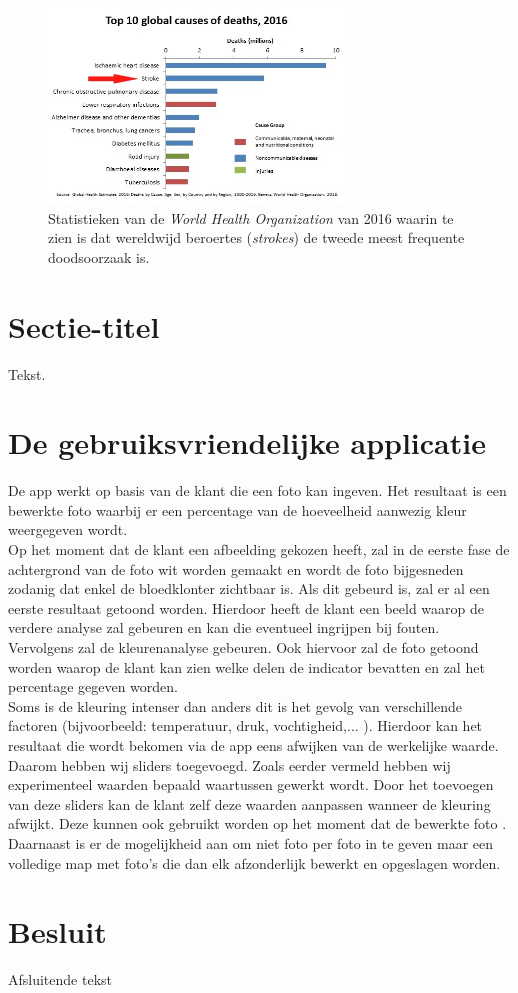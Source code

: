\documentclass[a4paper,kulak]{kulakarticle}
\begin{document}
	\begin{figure}[H]
		\centering
		\includegraphics[width = 0.7\textwidth]{top10doodsoorzaken.png}
	
		\caption{Statistieken van de \textit{World Health Organization} van 2016 waarin te zien is dat wereldwijd beroertes (\textit{strokes}) de tweede meest frequente doodsoorzaak is.}
		\label{figuur doodsoorzaken}
	\end{figure}

\pagebreak


\section{Sectie-titel}


Tekst.

\section{De gebruiksvriendelijke applicatie}
De app werkt op basis van de klant die een foto kan ingeven. Het resultaat is een bewerkte foto waarbij er een percentage van de hoeveelheid aanwezig kleur weergegeven wordt.\\
Op het moment dat de klant een afbeelding gekozen heeft, zal  in de eerste fase de achtergrond van de foto wit worden gemaakt en wordt de foto bijgesneden zodanig dat enkel de bloedklonter zichtbaar is. Als dit gebeurd is, zal er al een eerste resultaat getoond worden. Hierdoor heeft de klant een beeld waarop de verdere analyse zal gebeuren en kan die eventueel ingrijpen bij fouten. \\
Vervolgens zal de kleurenanalyse gebeuren. Ook hiervoor zal de foto getoond worden waarop de klant kan zien welke delen de indicator bevatten en zal het percentage gegeven worden. \\
Soms is de kleuring intenser dan anders dit is het gevolg van verschillende factoren (bijvoorbeeld: temperatuur, druk, vochtigheid,... ). Hierdoor kan het resultaat die wordt bekomen via de app eens afwijken van de werkelijke waarde. Daarom hebben wij sliders toegevoegd. Zoals eerder vermeld hebben wij experimenteel waarden bepaald waartussen gewerkt wordt. Door het toevoegen van deze sliders kan de klant zelf deze waarden aanpassen wanneer de kleuring afwijkt. Deze kunnen ook gebruikt worden op het moment dat de bewerkte foto .
Daarnaast is er de mogelijkheid aan om niet foto per foto in te geven maar een volledige map met foto's die dan elk afzonderlijk bewerkt en opgeslagen worden.

\section*{Besluit}

Afsluitende tekst


\end{document}

